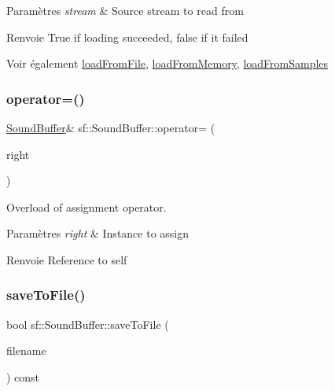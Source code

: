 \begin{DoxyParams}{Paramètres}
{\em stream} & Source stream to read from\\
\hline
\end{DoxyParams}
\begin{DoxyReturn}{Renvoie}
True if loading succeeded, false if it failed
\end{DoxyReturn}
\begin{DoxySeeAlso}{Voir également}
\hyperlink{classsf_1_1SoundBuffer_a2be6a8025c97eb622a7dff6cf2594394}{load\+From\+File}, \hyperlink{classsf_1_1SoundBuffer_af8cfa5599739a7edae69c5cba273d33f}{load\+From\+Memory}, \hyperlink{classsf_1_1SoundBuffer_a42d51ce4bb3b60c7ea06f63c273fd063}{load\+From\+Samples} 
\end{DoxySeeAlso}
\mbox{\label{classsf_1_1SoundBuffer_adcc786b60bbd95be1551368fafd274a7}} 
\subsubsection{\texorpdfstring{operator=()}{operator=()}}
{\footnotesize\ttfamily \hyperlink{classsf_1_1SoundBuffer}{Sound\+Buffer}\& sf\+::\+Sound\+Buffer\+::operator= (\begin{DoxyParamCaption}\item[{const \hyperlink{classsf_1_1SoundBuffer}{Sound\+Buffer} \&}]{right }\end{DoxyParamCaption})}



Overload of assignment operator. 


\begin{DoxyParams}{Paramètres}
{\em right} & Instance to assign\\
\hline
\end{DoxyParams}
\begin{DoxyReturn}{Renvoie}
Reference to self 
\end{DoxyReturn}
\mbox{\label{classsf_1_1SoundBuffer_aade64260c6375580a085314a30be007e}} 
\subsubsection{\texorpdfstring{save\+To\+File()}{saveToFile()}}
{\footnotesize\ttfamily bool sf\+::\+Sound\+Buffer\+::save\+To\+File (\begin{DoxyParamCaption}\item[{const std\+::string \&}]{filename }\end{DoxyParamCaption}) const}



